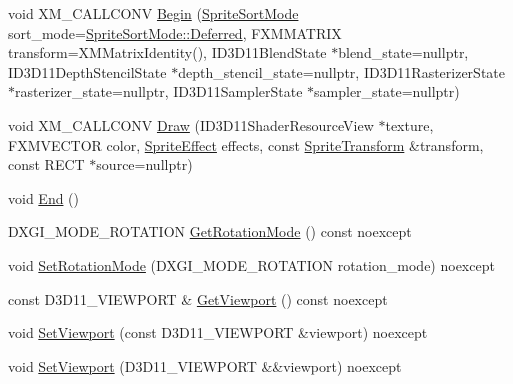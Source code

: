 \begin{DoxyCompactItemize}
\item 
void X\+M\+\_\+\+C\+A\+L\+L\+C\+O\+NV \hyperlink{classmage_1_1_sprite_batch_a76458df59d4fa6fe99d4dae375bf0fc5}{Begin} (\hyperlink{namespacemage_a256fa5833eecc408923de7ffadb5e014}{Sprite\+Sort\+Mode} sort\+\_\+mode=\hyperlink{namespacemage_a256fa5833eecc408923de7ffadb5e014a4ed71db54748b36eeb398876b0c747ac}{Sprite\+Sort\+Mode\+::\+Deferred}, F\+X\+M\+M\+A\+T\+R\+IX transform=X\+M\+Matrix\+Identity(), I\+D3\+D11\+Blend\+State $\ast$blend\+\_\+state=nullptr, I\+D3\+D11\+Depth\+Stencil\+State $\ast$depth\+\_\+stencil\+\_\+state=nullptr, I\+D3\+D11\+Rasterizer\+State $\ast$rasterizer\+\_\+state=nullptr, I\+D3\+D11\+Sampler\+State $\ast$sampler\+\_\+state=nullptr)
\item 
void X\+M\+\_\+\+C\+A\+L\+L\+C\+O\+NV \hyperlink{classmage_1_1_sprite_batch_aa1c49a91ab7f863ec51276d496ae1e66}{Draw} (I\+D3\+D11\+Shader\+Resource\+View $\ast$texture, F\+X\+M\+V\+E\+C\+T\+OR color, \hyperlink{namespacemage_a9cfe18123066ba4236f548f9de75d881}{Sprite\+Effect} effects, const \hyperlink{structmage_1_1_sprite_transform}{Sprite\+Transform} \&transform, const R\+E\+CT $\ast$source=nullptr)
\item 
void \hyperlink{classmage_1_1_sprite_batch_a9764372bb18b1c24a4a2f64ab0649569}{End} ()
\item 
D\+X\+G\+I\+\_\+\+M\+O\+D\+E\+\_\+\+R\+O\+T\+A\+T\+I\+ON \hyperlink{classmage_1_1_sprite_batch_ae38132bcf084f268dae7bfcc3b9c9a4d}{Get\+Rotation\+Mode} () const noexcept
\item 
void \hyperlink{classmage_1_1_sprite_batch_a59ec5e96a62bcd674cbf0d22f152b17f}{Set\+Rotation\+Mode} (D\+X\+G\+I\+\_\+\+M\+O\+D\+E\+\_\+\+R\+O\+T\+A\+T\+I\+ON rotation\+\_\+mode) noexcept
\item 
const D3\+D11\+\_\+\+V\+I\+E\+W\+P\+O\+RT \& \hyperlink{classmage_1_1_sprite_batch_ab4f95db776d7c20896f9420bc60d90c8}{Get\+Viewport} () const noexcept
\item 
void \hyperlink{classmage_1_1_sprite_batch_a5b02194c2bdbbe5b04e95ab401e6de4e}{Set\+Viewport} (const D3\+D11\+\_\+\+V\+I\+E\+W\+P\+O\+RT \&viewport) noexcept
\item 
void \hyperlink{classmage_1_1_sprite_batch_aef86940ffc869785fb8ff8eb85ab7b46}{Set\+Viewport} (D3\+D11\+\_\+\+V\+I\+E\+W\+P\+O\+RT \&\&viewport) noexcept
\end{DoxyCompactItemize}
